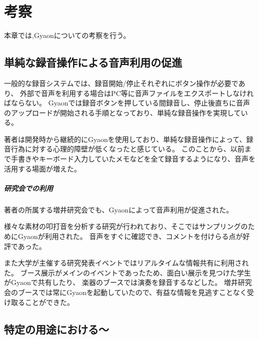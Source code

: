 \chapter{考察}
\label{chap:discussion}

本章では,Gyaonについての考察を行う。

\newpage

\section{単純な録音操作による音声利用の促進}
一般的な録音システムでは、録音開始/停止それぞれにボタン操作が必要であり、
外部で音声を利用する場合はPC等に音声ファイルをエクスポートしなければならない。
Gyaonでは録音ボタンを押している間録音し、停止後直ちに音声のアップロードが開始される手順となっており、単純な録音操作を実現している。

著者は開発時から継続的にGyaonを使用しており、単純な録音操作によって、録音行為に対する心理的障壁が低くなったと感じている。
このことから、以前まで手書きやキーボード入力していたメモなどを全て録音するようになり、音声を活用する場面が増えた。

\paragraph{研究会での利用}
著者の所属する増井研究会でも、Gyaonによって音声利用が促進された。

様々な素材の叩打音を分析する研究が行われており、そこではサンプリングのためにGyaonが利用された。
音声をすぐに確認でき、コメントを付けらる点が好評であった。

また大学が主催する研究発表イベントではリアルタイムな情報共有に利用された。
ブース展示がメインのイベントであったため、面白い展示を見つけた学生がGyaonで共有したり、
楽器のブースでは演奏を録音するなどした。
増井研究会のブースでは常にGyaonを起動していたので、有益な情報を見逃すことなく受け取ることができた。

%


\section{特定の用途における〜}

